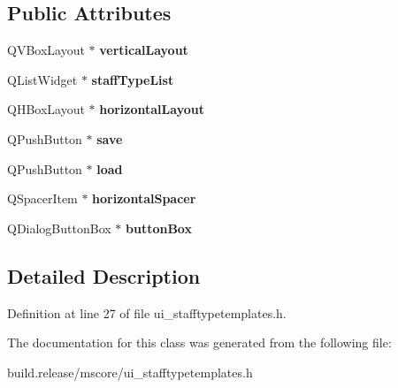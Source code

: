 \subsection*{Public Attributes}
\begin{DoxyCompactItemize}
\item 
\mbox{\label{class_ui___staff_type_templates_aed8ec050085965ff0c66e8e8378cbd90}} 
Q\+V\+Box\+Layout $\ast$ {\bfseries vertical\+Layout}
\item 
\mbox{\label{class_ui___staff_type_templates_a68669533d9ae5eedcfbaad4f2e7136f5}} 
Q\+List\+Widget $\ast$ {\bfseries staff\+Type\+List}
\item 
\mbox{\label{class_ui___staff_type_templates_a06d69d0eee41897ebac5bc216351baf4}} 
Q\+H\+Box\+Layout $\ast$ {\bfseries horizontal\+Layout}
\item 
\mbox{\label{class_ui___staff_type_templates_a80b0c462b1e61e1f91776323e1566adc}} 
Q\+Push\+Button $\ast$ {\bfseries save}
\item 
\mbox{\label{class_ui___staff_type_templates_ad20a5457643aab7fa2e185117ebce634}} 
Q\+Push\+Button $\ast$ {\bfseries load}
\item 
\mbox{\label{class_ui___staff_type_templates_aee4426779b39c850c90920044018c11a}} 
Q\+Spacer\+Item $\ast$ {\bfseries horizontal\+Spacer}
\item 
\mbox{\label{class_ui___staff_type_templates_a8e5ab01e538c7d06fd1a7392a58e673f}} 
Q\+Dialog\+Button\+Box $\ast$ {\bfseries button\+Box}
\end{DoxyCompactItemize}


\subsection{Detailed Description}


Definition at line 27 of file ui\+\_\+stafftypetemplates.\+h.



The documentation for this class was generated from the following file\+:\begin{DoxyCompactItemize}
\item 
build.\+release/mscore/ui\+\_\+stafftypetemplates.\+h\end{DoxyCompactItemize}
